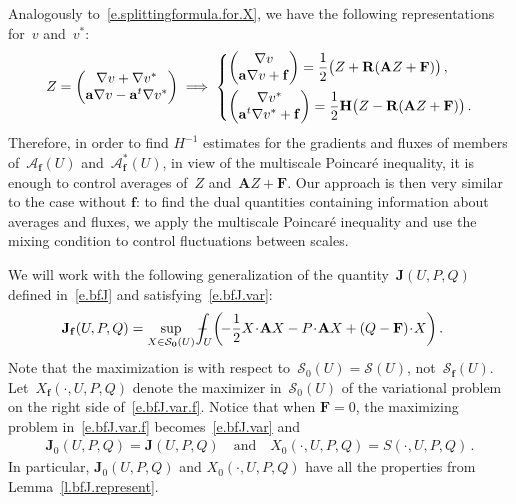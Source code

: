\documentclass[11pt]{article} %
\numberwithin{equation}{section}
\theoremstyle{definition}
\let\originalleft\left
\let\originalright\right
\renewcommand{\left}{\mathopen{}\mathclose\bgroup\originalleft}
\renewcommand{\right}{\aftergroup\egroup\originalright}
\newcommand{\qand}{\quad \mbox{and} \quad }
\newcommand{\f}{\mathbf{f}}
\renewcommand{\a}{\mathbf{a}}
\renewcommand{\S}{\mathcal{S}}
\def\Xint#1{\mathchoice
{\XXint\displaystyle\textstyle{#1}}%
{\XXint\textstyle\scriptstyle{#1}}%
{\XXint\scriptstyle\scriptscriptstyle{#1}}%
{\XXint\scriptscriptstyle\scriptscriptstyle{#1}}%
\!\int}
\def\XXint#1#2#3{{\setbox0=\hbox{$#1{#2#3}{\int}$}
\vcenter{\hbox{$#2#3$}}\kern-.5\wd0}}
\def\fint{\Xint-}
\newcommand{\A}{\mathcal{A}}
\newcommand{\bfA}{\mathbf{A}}
\newcommand{\bfJ}{\mathbf{J}}
\newcommand{\bfF}{\mathbf{F}}
\newcommand{\rota}{\mathbf{R}}
\newcommand{\refl}{\mathbf{H}}
\begin{document}
Analogously to~\eqref{e.splittingformula.for.X}, we have the following representations for~$v$ and~$v^*$: 
\begin{equation} \label{e.f.splittingformula.for.Z}
Z = 
\begin{pmatrix} \nabla v + \nabla v^* \\ \a \nabla v - \a^t \nabla v^* \end{pmatrix} 
\implies 
\left\{
\begin{aligned}
& \begin{pmatrix} \nabla v \\ \a \nabla v + \f \end{pmatrix} = \frac12 \bigl( Z + \rota ( \bfA Z + \bfF) \bigr) 
 \,, 
\\ &   
\begin{pmatrix} \nabla v^* \\ \a^t \nabla v^* + \f \end{pmatrix} = \frac12 \refl \bigl( Z - \rota ( \bfA Z + \bfF) \bigr) 
\,.
\end{aligned}
\right.
\end{equation}
Therefore, in order to find $H^{-1}$ estimates for the gradients and fluxes of members of~$\A_\f(U)$ and~$\A_\f^*(U)$, in view of the multiscale Poincar\'e inequality, it is enough to control averages of~$Z$ and~$\bfA Z + \bfF$. Our approach is then very similar to the case without $\f$: to find the dual quantities containing information about averages and fluxes, we apply the multiscale Poincar\'e inequality and use the mixing condition to control fluctuations between scales. 

\smallskip

We will work with the following generalization of the quantity~$\bfJ(U,P,Q)$ defined in~\eqref{e.bfJ} and satisfying~\eqref{e.bfJ.var}: 
\begin{align}
\label{e.bfJ.var.f}
\bfJ_\f(U, P,Q )
& 
=
\sup_{X \in \S_{\mathbf{0}}(U)}
\fint_U
\biggl( \!
-\frac12  X  \! \cdot \! \bfA X 
- 
P \! \cdot \!\bfA X 
+
(Q - \bfF) \! \cdot \! X
\biggr)
\,.
\end{align}
Note that the maximization is with respect to~$\S_{0}(U) = \S(U)$, not~$\S_\f(U)$.  Let~$X_\f(\cdot,U,P,Q)$ denote the maximizer in~$\S_{0}(U)$ of the variational problem on the right side of~\eqref{e.bfJ.var.f}. Notice that when $\bfF = 0$, the maximizing problem in~\eqref{e.bfJ.var.f} becomes~\eqref{e.bfJ.var} and
\begin{align*}  
\bfJ_0(U, P,Q ) = \bfJ(U, P,Q )
\qand
X_0(\cdot,U,P,Q) = S(\cdot,U,P,Q) 
\,.
\end{align*}
In particular, $\bfJ_0(U, P,Q )$ and $X_0(\cdot,U,P,Q)$ have all the properties from Lemma~\ref{l.bfJ.represent}. 
\end{document}
